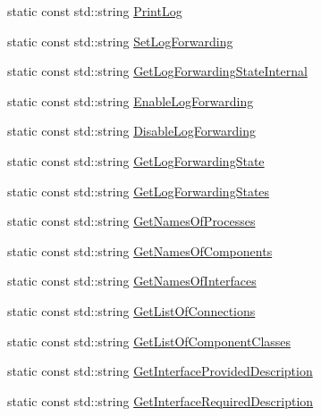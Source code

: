 \begin{DoxyCompactItemize}
static const std\-::string \hyperlink{classmts_manager_component_base_1_1_command_names_a3a2d2301895563f7d943ff1014f8a4d6}{Print\-Log}
\item 
static const std\-::string \hyperlink{classmts_manager_component_base_1_1_command_names_a494481ad11ce948eb96b3528361a9606}{Set\-Log\-Forwarding}
\item 
static const std\-::string \hyperlink{classmts_manager_component_base_1_1_command_names_a71c259401593f4160cff60c9be3f6bd0}{Get\-Log\-Forwarding\-State\-Internal}
\item 
static const std\-::string \hyperlink{classmts_manager_component_base_1_1_command_names_a41cb283e554b57fd31e8eece7166fdc7}{Enable\-Log\-Forwarding}
\item 
static const std\-::string \hyperlink{classmts_manager_component_base_1_1_command_names_a323f4110ced3e22a39fe0c67b7f21be8}{Disable\-Log\-Forwarding}
\item 
static const std\-::string \hyperlink{classmts_manager_component_base_1_1_command_names_a039f0c03c366dadc10675b70e81b3b66}{Get\-Log\-Forwarding\-State}
\item 
static const std\-::string \hyperlink{classmts_manager_component_base_1_1_command_names_aa906abe73c7cc36fdc31f979f3b24228}{Get\-Log\-Forwarding\-States}
\item 
static const std\-::string \hyperlink{classmts_manager_component_base_1_1_command_names_acc637a1a5ddd03cd1f316ff284bbeb70}{Get\-Names\-Of\-Processes}
\item 
static const std\-::string \hyperlink{classmts_manager_component_base_1_1_command_names_a30b814882339835ab99d1a1458dfe5e7}{Get\-Names\-Of\-Components}
\item 
static const std\-::string \hyperlink{classmts_manager_component_base_1_1_command_names_a901635542033ad1816bf2e9ba20fcc38}{Get\-Names\-Of\-Interfaces}
\item 
static const std\-::string \hyperlink{classmts_manager_component_base_1_1_command_names_a81c8a5b498922e4f2d27faaa063e0994}{Get\-List\-Of\-Connections}
\item 
static const std\-::string \hyperlink{classmts_manager_component_base_1_1_command_names_a97dfc9528f6d693ec20ce8acab00e4ae}{Get\-List\-Of\-Component\-Classes}
\item 
static const std\-::string \hyperlink{classmts_manager_component_base_1_1_command_names_a48b6d419a169927b6adcbce8471bdb2b}{Get\-Interface\-Provided\-Description}
\item 
static const std\-::string \hyperlink{classmts_manager_component_base_1_1_command_names_a45417e53e8ddd8823a8ce9248c782d64}{Get\-Interface\-Required\-Description}

\end{DoxyCompactItemize}
